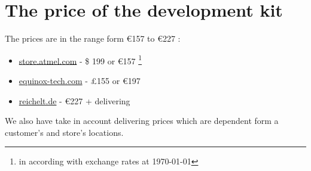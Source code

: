 \documentclass[english]{article}
\begin{document}
\section{The price of the development kit}
The prices are in the range form \euro 157  to \euro 227  :
\begin{itemize}
\item \href{http://store.atmel.com/PartDetail.aspx?q=p:10500155#tc:description}{store.atmel.com} - \$ 199 or \euro 157 \footnote[1]{in according with exchange rates at \today} 

\item \href{http://www.equinox-tech.com/products/details.asp?ID=1215}{equinox-tech.com} - \pounds 155 or \euro 197 

\item \href{http://www.reichelt.de/Programmer-Entwicklungstools/AVR-STK-600/3//index.html?ACTION=3&GROUPID=5514&ARTICLE=84348&SHOW=1&OFFSET=16&&SID=14UpmGeX8AAAIAAAs52Xc22cc5ced75ce22e99ee3d7b9000dabc6&LANGUAGE=EN}{reichelt.de} - \euro 227  + delivering 
\end{itemize}
We also have take in account delivering prices which are dependent form a customer's and store's locations.
\end{document}
